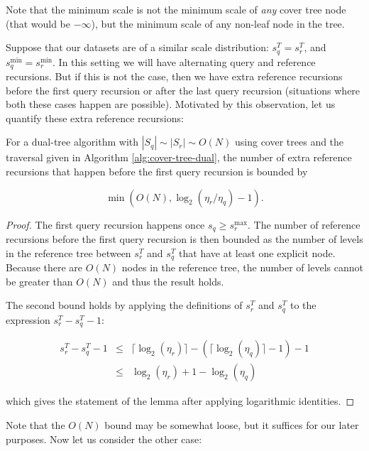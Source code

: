 Note that the minimum scale is not the minimum scale of {\it any} cover tree
node (that would be $-\infty$), but the minimum scale of any non-leaf node in
the tree.

Suppose that our datasets are of a similar scale distribution: $s_q^T = s_r^T$,
and $s_q^{\min} = s_r^{\min}$.  In this setting we will have alternating query
and reference recursions.  But if this is not the case, then we have extra
reference recursions before the first query recursion or after the last query
recursion (situations where both these cases happen are possible).  Motivated by
this observation, let us quantify these extra reference recursions:

\begin{lemma}
\label{lem:extcase1}
For a dual-tree algorithm with $|S_q| \sim |S_r| \sim O(N)$ using cover trees and
the traversal given in Algorithm \ref{alg:cover-tree-dual}, the number of extra
reference recursions that happen before the first query recursion is bounded by

\begin{equation}
\min\left(O(N), \log_2(\eta_r / \eta_q) - 1\right).
\end{equation}
\end{lemma}

\begin{proof}
The first query recursion happens once $s_q \ge s_r^{\max}$.  The number of
reference recursions before the first query recursion is then bounded as the
number of levels in the reference tree between $s_r^T$ and $s_q^T$ that have at
least one explicit node.  Because there are $O(N)$ nodes in the reference tree,
the number of levels cannot be greater than $O(N)$ and thus the result holds.

The second bound holds by applying the definitions of $s_r^T$ and $s_q^T$ to the
expression $s_r^T - s_q^T - 1$:

\begin{eqnarray}
s_r^T - s_q^T - 1 &\le& \lceil \log_2(\eta_r) \rceil - (\lceil \log_2(\eta_q)
\rceil - 1) - 1 \\
&\le& \log_2(\eta_r) + 1 - \log_2(\eta_q)
\end{eqnarray}

\noindent which gives the statement of the lemma after applying logarithmic
identities.
\end{proof}

Note that the $O(N)$ bound may be somewhat loose, but it suffices for our later
purposes.  Now let us consider the other case:

